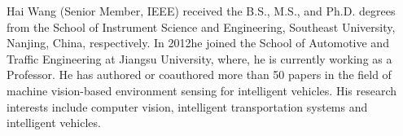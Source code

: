     \begin{IEEEbiography}{Hai Wang}
        (Senior Member, IEEE) received the B.S., M.S., and Ph.D. degrees from the School of Instrument Science and Engineering, Southeast University, Nanjing, China, respectively. In 2012he joined the School of Automotive and Traffic Engineering at Jiangsu University, where, he is currently working as a Professor. He has authored or coauthored more than 50 papers in the field of machine vision-based environment sensing for intelligent vehicles. His research interests include computer vision, intelligent transportation systems and intelligent vehicles. 
    \end{IEEEbiography}
       

